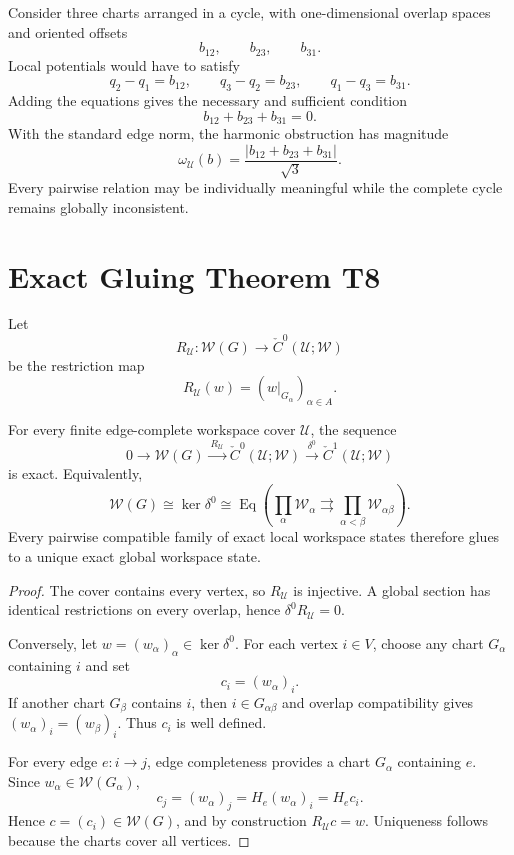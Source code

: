 
Consider three charts arranged in a cycle, with one-dimensional overlap
spaces and oriented offsets
\[
b_{12},\qquad b_{23},\qquad b_{31}.
\]
Local potentials would have to satisfy
\[
q_2-q_1=b_{12},
\qquad
q_3-q_2=b_{23},
\qquad
q_1-q_3=b_{31}.
\]
Adding the equations gives the necessary and sufficient condition
\[
\boxed{
b_{12}+b_{23}+b_{31}=0.}
\]
With the standard edge norm, the harmonic obstruction has magnitude
\[
\boxed{
\omega_{\mathcal U}(b)
=
\frac{|b_{12}+b_{23}+b_{31}|}{\sqrt3}.
}
\]
Every pairwise relation may be individually meaningful while the complete
cycle remains globally inconsistent.

\section{Exact Gluing Theorem T8}

Let
\[
R_{\mathcal U}:\mathscr W(G)
\longrightarrow
\check C^0(\mathcal U;\mathscr W)
\]
be the restriction map
\[
R_{\mathcal U}(w)
=
(w|_{G_\alpha})_{\alpha\in A}.
\]

\begin{SRWTtheorem}\label{SRWT:thm:exact-workspace-gluing}
For every finite edge-complete workspace cover \(\mathcal U\), the sequence
\[
\boxed{
0
\longrightarrow
\mathscr W(G)
\xrightarrow{\ R_{\mathcal U}\ }
\check C^0(\mathcal U;\mathscr W)
\xrightarrow{\ \delta^0\ }
\check C^1(\mathcal U;\mathscr W)
}
\]
is exact. Equivalently,
\[
\boxed{
\mathscr W(G)
\cong
\ker\delta^0
\cong
\operatorname{Eq}
\left(
\prod_\alpha\mathscr W_\alpha
\rightrightarrows
\prod_{\alpha<\beta}\mathscr W_{\alpha\beta}
\right).
}
\]
Every pairwise compatible family of exact local workspace states therefore
glues to a unique exact global workspace state.
\end{SRWTtheorem}

\begin{proof}
The cover contains every vertex, so \(R_{\mathcal U}\) is injective. A global
section has identical restrictions on every overlap, hence
\(\delta^0R_{\mathcal U}=0\).

Conversely, let \(w=(w_\alpha)_\alpha\in\ker\delta^0\). For each vertex
\(i\in V\), choose any chart \(G_\alpha\) containing \(i\) and set
\[
c_i=(w_\alpha)_i.
\]
If another chart \(G_\beta\) contains \(i\), then \(i\in G_{\alpha\beta}\)
and overlap compatibility gives
\((w_\alpha)_i=(w_\beta)_i\). Thus \(c_i\) is well defined.

For every edge \(e:i\to j\), edge completeness provides a chart
\(G_\alpha\) containing \(e\). Since \(w_\alpha\in\mathscr W(G_\alpha)\),
\[
c_j=(w_\alpha)_j=H_e(w_\alpha)_i=H_ec_i.
\]
Hence \(c=(c_i)\in\mathscr W(G)\), and by construction
\(R_{\mathcal U}c=w\). Uniqueness follows because the charts cover all
vertices.
\end{proof}


